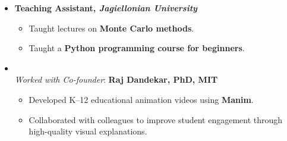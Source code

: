 \newcommand{\cvsectionlabel}[1]{\item[]\vspace{2pt}\textcolor{accentblue}{\textbf{\large #1}}\vspace{-2pt}}

\noindent {}
\begin{itemize}
\item \textbf{Teaching Assistant, \emph{Jagiellonian University}}
    \begin{itemize}
        \item Taught lectures on \textbf{Monte Carlo methods}.
        \item Taught a \textbf{Python programming course for beginners}.
    \end{itemize}
\end{itemize}

\noindent {}
\begin{itemize}
\item {}\\
\textit{Worked with Co-founder}: \textbf{Raj Dandekar, PhD, MIT}
    \begin{itemize}
        \item Developed K--12 educational animation videos using \textbf{Manim}.
        \item Collaborated with colleagues to improve student engagement through high-quality visual explanations.
    \end{itemize}
\end{itemize}

